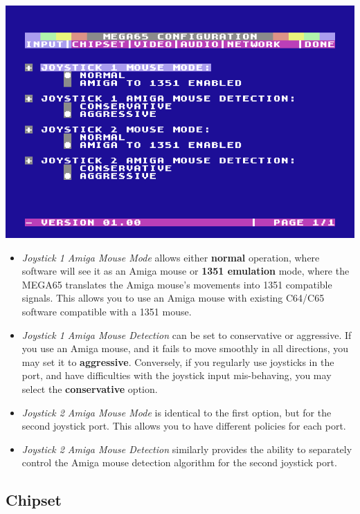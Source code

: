 \includegraphics[width=\linewidth]{images/ss-m65config-1.png}

\begin{itemize}
  \item{\em Joystick 1 Amiga Mouse Mode} allows either {\bf normal} operation,
  where software will see it as an Amiga mouse or {\bf 1351 emulation} mode, where the MEGA65 translates the Amiga mouse's movements into 1351 compatible  signals. This allows you to use an Amiga mouse with existing C64/C65 software compatible with a 1351 mouse.
  \item{\em Joystick 1 Amiga Mouse Detection} can be set to conservative or aggressive. If you use an Amiga mouse, and it fails to move smoothly in all directions, you may set it to {\bf aggressive}. Conversely, if you regularly use joysticks in the port, and have difficulties with the joystick input mis-behaving, you may select the {\bf conservative} option.
  \item{\em Joystick 2 Amiga Mouse Mode} is identical to the first option, but for the second joystick port. This allows you to have different policies for each port.
  \item{\em Joystick 2 Amiga Mouse Detection} similarly provides the ability to separately control the Amiga mouse detection algorithm for the second joystick port.
\end{itemize}


\subsection{Chipset}

